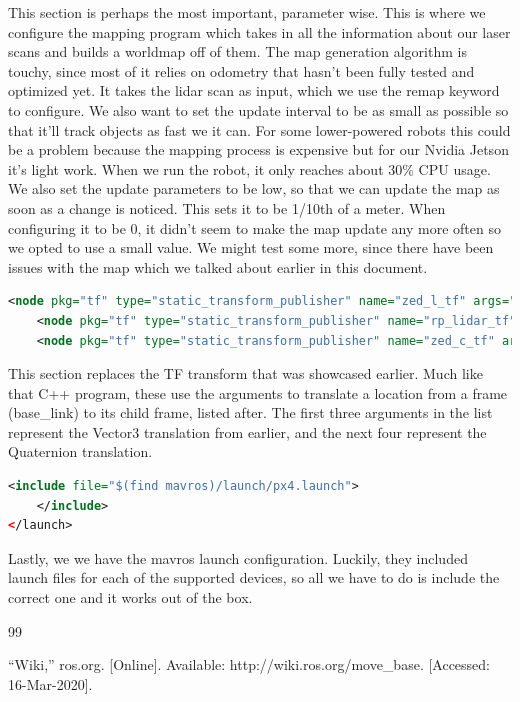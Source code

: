 \documentclass[onecolumn, draftclsnofoot, 10pt, compsoc]{IEEEtran}
\begin{document}
This section is perhaps the most important, parameter wise. This is where we configure the mapping program which takes in all the information about our laser scans and builds a worldmap off of them. The map generation algorithm is touchy, since most of it relies on odometry that hasn't been fully tested and optimized yet. It takes the lidar scan as input, which we use the remap keyword to configure. We also want to set the update interval to be as small as possible so that it'll track objects as fast we it can. For some lower-powered robots this could be a problem because the mapping process is expensive but for our Nvidia Jetson it's light work. When we run the robot, it only reaches about 30\% CPU usage. We also set the update parameters to be low, so that we can update the map as soon as a change is noticed. This sets it to be 1/10th of a meter. When configuring it to be 0, it didn't seem to make the map update any more often so we opted to use a small value. We might test some more, since there have been issues with the map which we talked about earlier in this document.

\begin{lstlisting}[language=XML]
    <node pkg="tf" type="static_transform_publisher" name="zed_l_tf" args="-0.05 0.15 0.08 0 0 -0.707 1 base_link zed_left_camera_frame 10"/>
    <node pkg="tf" type="static_transform_publisher" name="rp_lidar_tf" args="0 0 0.08 0 0 0 1 base_link circle_laser_frame 10"/>
    <node pkg="tf" type="static_transform_publisher" name="zed_c_tf" args="0.0 0.15 0.08 0 0 -0.707 1 base_link zed_camera_center 10"/>
\end{lstlisting}

This section replaces the TF transform that was showcased earlier. Much like that C++ program, these use the arguments to translate a location from a frame (base\_link) to its child frame, listed after. The first three arguments in the list represent the Vector3 translation from earlier, and the next four represent the Quaternion translation.

\begin{lstlisting}[language=XML]
    <include file="$(find mavros)/launch/px4.launch">
    </include>
</launch>
\end{lstlisting}

Lastly, we we have the mavros launch configuration. Luckily, they included launch files for each of the supported devices, so all we have to do is include the correct one and it works out of the box.



\begin{thebibliography}{99}

“Wiki,” ros.org. [Online]. Available: http://wiki.ros.org/move\_base. [Accessed: 16-Mar-2020].

\end{thebibliography}
\end{document}

